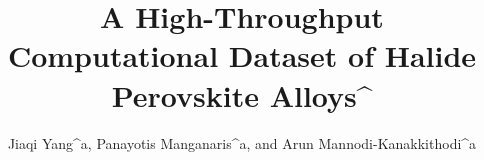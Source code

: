 \documentclass[twoside,twocolumn,9pt]{article}
\begin{document}
\makeatletter 
\newlength{\figrulesep} 
\setlength{\figrulesep}{0.5\textfloatsep} 

\newcommand{\topfigrule}{\vspace*{-1pt}%
  \noindent{\color{cream}\rule[-\figrulesep]{\columnwidth}{1.5pt}} }

\newcommand{\botfigrule}{\vspace*{-2pt}%
  \noindent{\color{cream}\rule[\figrulesep]{\columnwidth}{1.5pt}} }

\newcommand{\dblfigrule}{\vspace*{-1pt}%
  \noindent{\color{cream}\rule[-\figrulesep]{\textwidth}{1.5pt}} }

\makeatother

\title{A High-Throughput Computational Dataset of Halide Perovskite Alloys^\dag}
\author{Jiaqi Yang^a, Panayotis Manganaris^a, and Arun Mannodi-Kanakkithodi^a}

      
      
\end{document}
